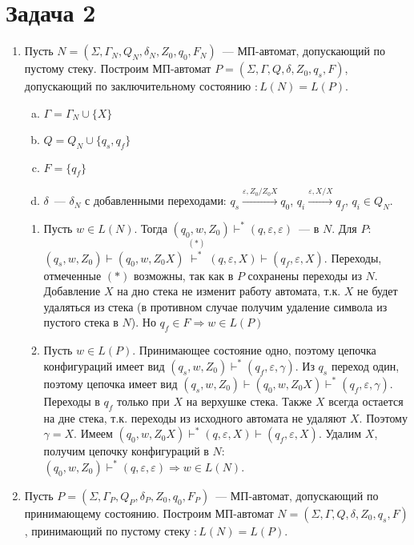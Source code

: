\documentclass[a4paper]{article}
\begin{document}
\section*{Задача 2}
\begin{enumerate}
\item Пусть $N=(\Sigma,\Gamma_N,Q_N,\delta_N,Z_0,q_0,F_N)$~--- МП-автомат, допускающий по пустому стеку. Построим МП-автомат $P=(\Sigma,\Gamma,Q,\delta,Z_0,q_s,F)$, допускающий по заключительному состоянию $\colon L(N)=L(P)$.\begin{enumerate}[a.]
\item $\Gamma=\Gamma_N\cup \{X\}$
\item $Q=Q_N\cup\{q_s,q_f\}$
\item $F=\{q_f\}$
\item $\delta$~--- $\delta_N$ с добавленными переходами: $q_s\overset{\varepsilon,Z_0/Z_0X}{\longrightarrow}q_0$, $q_i\overset{\varepsilon,X/X}{\longrightarrow}q_f,\,q_i\in Q_N$.
\end{enumerate}
\begin{enumerate}[1.]
\item Пусть $w\in L(N)$. Тогда $(q_0,w,Z_0)\vdash^*(q,\varepsilon,\varepsilon)$~--- в $N$. Для $P$: $(q_s,w,Z_0)\vdash(q_0,w,Z_0X)\overset{(*)}{\vdash^*}(q,\varepsilon,X)\vdash(q_f,\varepsilon,X)$. Переходы, отмеченные $(*)$ возможны, так как в $P$ сохранены переходы из $N$. Добавление $X$ на дно стека не изменит работу автомата, т.к. $X$ не будет удаляться из стека (в противном случае получим удаление символа из пустого стека в $N$). Но $q_f\in F\Rightarrow w\in L(P)$
\item Пусть $w\in L(P)$. Принимающее состояние одно, поэтому цепочка конфигураций имеет вид $(q_s,w,Z_0)\vdash^*(q_f,\varepsilon,\gamma)$. Из $q_s$ переход один, поэтому цепочка имеет вид $(q_s,w,Z_0)\vdash(q_0,w,Z_0X)\vdash^*(q_f,\varepsilon,\gamma)$. Переходы в $q_f$ только при $X$ на верхушке стека. Также $X$ всегда остается на дне стека, т.к. переходы из исходного автомата не удаляют $X$. Поэтому $\gamma=X$. Имеем $(q_0,w,Z_0X)\vdash^*(q,\varepsilon,X)\vdash(q_f,\varepsilon,X)$. Удалим $X$, получим цепочку конфигураций в $N$: $(q_0,w,Z_0)\vdash^*(q,\varepsilon,\varepsilon)\Rightarrow w\in L(N)$.
\end{enumerate}
\item Пусть $P=(\Sigma,\Gamma_P,Q_P,\delta_P,Z_0,q_0,F_P)$~--- МП-автомат, допускающий по принимающему состоянию. Построим МП-автомат $N=(\Sigma,\Gamma,Q,\delta,Z_0,q_s,F)$, принимающий по пустому стеку $\colon L(N)=L(P)$.\begin{enumerate}[a.]

\end{enumerate}
\end{enumerate}
\end{document}

